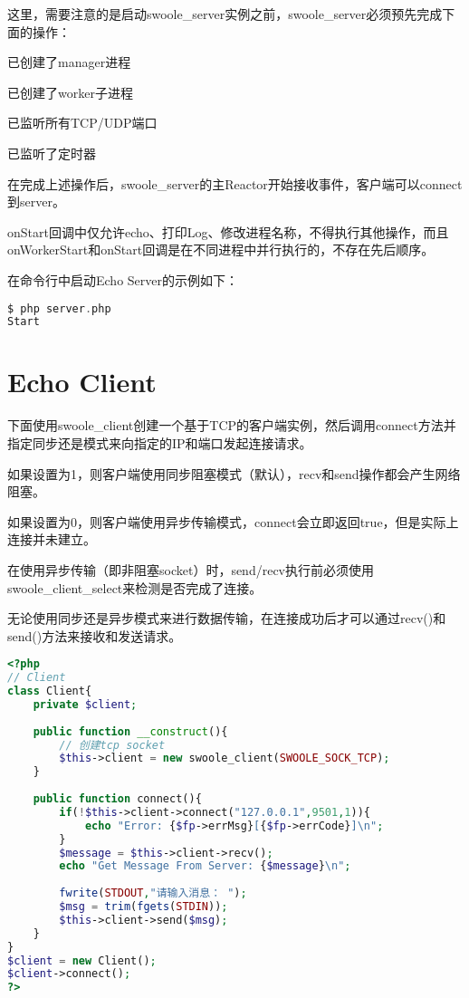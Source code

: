 这里，需要注意的是启动swoole\_server实例之前，swoole\_server必须预先完成下面的操作：

\begin{compactitem}
\item 已创建了manager进程
\item 已创建了worker子进程
\item 已监听所有TCP/UDP端口
\item 已监听了定时器
\end{compactitem}

在完成上述操作后，swoole\_server的主Reactor开始接收事件，客户端可以connect到server。

onStart回调中仅允许echo、打印Log、修改进程名称，不得执行其他操作，而且onWorkerStart和onStart回调是在不同进程中并行执行的，不存在先后顺序。

在命令行中启动Echo Server的示例如下：

\begin{lstlisting}[language=PHP]
$ php server.php
Start
\end{lstlisting}

\section{Echo Client}

下面使用swoole\_client创建一个基于TCP的客户端实例，然后调用connect方法并指定同步还是模式来向指定的IP和端口发起连接请求。

\begin{compactitem}
\item 如果设置为1，则客户端使用同步阻塞模式（默认），recv和send操作都会产生网络阻塞。
\item 如果设置为0，则客户端使用异步传输模式，connect会立即返回true，但是实际上连接并未建立。
\end{compactitem}

在使用异步传输（即非阻塞socket）时，send/recv执行前必须使用swoole\_client\_select来检测是否完成了连接。

无论使用同步还是异步模式来进行数据传输，在连接成功后才可以通过recv()和send()方法来接收和发送请求。



\begin{lstlisting}[language=PHP]
<?php
// Client
class Client{
	private $client;
	
	public function __construct(){
		// 创建tcp socket
		$this->client = new swoole_client(SWOOLE_SOCK_TCP);
	}
	
	public function connect(){
		if(!$this->client->connect("127.0.0.1",9501,1)){
			echo "Error: {$fp->errMsg}[{$fp->errCode}]\n";
		}
		$message = $this->client->recv();
		echo "Get Message From Server: {$message}\n";
		
		fwrite(STDOUT,"请输入消息： ");
		$msg = trim(fgets(STDIN));
		$this->client->send($msg);
	}
}
$client = new Client();
$client->connect();
?>
\end{lstlisting}


